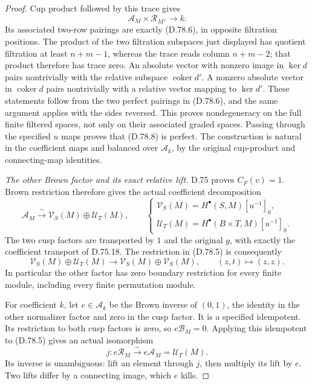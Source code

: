 \begin{proof}
Cup product followed by this trace gives
\[
 \mathcal A_M\times\mathcal R_{M^\vee}\longrightarrow k.       \tag{D.78.8}
\]
Its associated two-row pairings are exactly (D.78.6), in opposite filtration
positions. The product of the two filtration subspaces just displayed has
quotient filtration at least $n+m-1$, whereas the trace reads column
$n+m-2$; that product therefore has trace zero. An absolute vector with
nonzero image in $\ker d$ pairs nontrivially with the relative subspace
$\operatorname{coker}d'$. A nonzero absolute vector in
$\operatorname{coker}d$ pairs nontrivially with a relative vector mapping
to $\ker d'$. These statements follow from the two perfect pairings in
(D.78.6), and the same argument applies with the sides reversed. This proves
nondegeneracy on the full finite filtered spaces, not only on their
associated graded spaces. Passing through the specified $u$ maps proves
that (D.78.8) is perfect.
The construction is natural in the coefficient maps and balanced over
$\mathcal A_k$, by the original cup-product and connecting-map identities.

\emph{The other Brown factor and its exact relative lift.}
D.75 proves $C_F(v)=1$. Brown restriction therefore gives the actual
coefficient decomposition
\[
 \mathcal A_M\xrightarrow{\ \sim\ }
 \mathcal V_S(M)\oplus\mathcal U_T(M),\qquad
 \begin{cases}
 \mathcal V_S(M)=H^\bullet(S,M)[u^{-1}]_0,\\
 \mathcal U_T(M)=H^\bullet(B\times T,M)[u^{-1}]_0.
 \end{cases}                                                  \tag{D.78.9}
\]
The two cusp factors are transported by $1$ and the original $g$, with
exactly the coefficient transport of D.75.18. The restriction in (D.78.5)
is consequently
\[
 \mathcal V_S(M)\oplus\mathcal U_T(M)
            \longrightarrow\mathcal V_S(M)\oplus\mathcal V_S(M),
              \qquad(z,t)\longmapsto(z,z).                    \tag{D.78.10}
\]
In particular the other factor has zero boundary restriction for every
finite module, including every finite permutation module.

For coefficient $k$, let $e\in\mathcal A_k$ be the Brown inverse of
$(0,1)$, the identity in the other normalizer factor and zero in the cusp
factor. It is a specified idempotent. Its restriction to both cusp factors
is zero, so $e\mathcal B_M=0$. Applying this idempotent to (D.78.5) gives
an actual isomorphism
\[
            j:e\mathcal R_M\xrightarrow{\ \sim\ }
                         e\mathcal A_M=\mathcal U_T(M).       \tag{D.78.11}
\]
Its inverse is unambiguous: lift an element through $j$, then multiply
its lift by $e$. Two lifts differ by a connecting image, which $e$ kills.


\end{proof}
